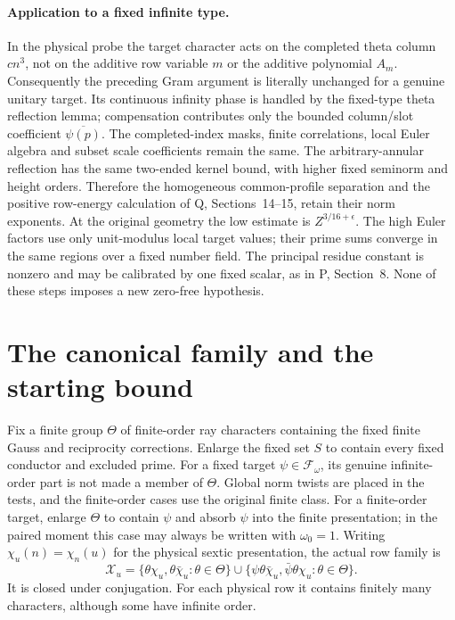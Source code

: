 \documentclass[11pt,a4paper]{article}
\theoremstyle{remark}\newtheorem{remark}[theorem]{Remark}
\newcommand{\Packet}{\mathscr F_\omega}
\newcommand{\Xcal}{\mathcal X}
\numberwithin{equation}{section}
\begin{document}
\paragraph{Application to a fixed infinite type.}
In the physical probe the target character acts on the completed
theta column $cn^3$, not on the additive row variable $m$ or the
additive polynomial $A_m$. Consequently the preceding Gram argument
is literally unchanged for a genuine unitary target. Its continuous
infinity phase is handled by the fixed-type theta reflection lemma;
compensation contributes only the bounded column/slot coefficient
$\overline{\psi(p)}$. The completed-index masks, finite correlations,
local Euler algebra and subset scale coefficients remain the same.
The arbitrary-annular reflection has the same two-ended kernel
bound, with higher fixed seminorm and height orders. Therefore the
homogeneous common-profile separation and the positive row-energy
calculation of Q, Sections~14--15, retain their norm exponents.
At the original geometry the low estimate is $Z^{3/16+\epsilon}$.
The high Euler factors use only unit-modulus local target values;
their prime sums converge in the same regions over a fixed number
field. The principal residue constant is nonzero and may be calibrated
by one fixed scalar, as in P, Section~8. None of these steps imposes
a new zero-free hypothesis.


\section{The canonical family and the starting bound}\label{sec-inverse}

Fix a finite group $\Theta$ of finite-order ray characters containing
the fixed finite Gauss and reciprocity corrections. Enlarge the fixed set
$S$ to contain every fixed conductor and excluded prime. For a fixed target $\psi\in\Packet$, its genuine infinite-order
part is not made a member of $\Theta$. Global norm twists are placed
in the tests, and the finite-order cases use the original finite class.
For a finite-order target, enlarge $\Theta$ to contain $\psi$
and absorb $\psi$ into the finite presentation; in the paired
moment this case may always be written with $\omega_0=1$.
Writing $\chi_u(n)=\chi_n(u)$ for the physical sextic presentation,
the actual row family is
\begin{equation}\label{eq-family}
 \Xcal_u=
 \{\theta\chi_u,\theta\bar\chi_u:\theta\in\Theta\}
 \cup
 \{\psi\theta\bar\chi_u,\bar\psi\theta\chi_u:
                                     \theta\in\Theta\}.
\end{equation}
It is closed under conjugation. For each physical row it contains
finitely many characters, although some have infinite order.
\end{document}
